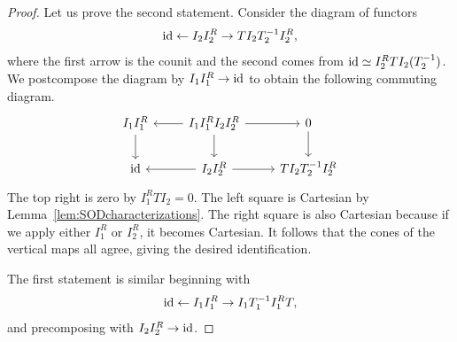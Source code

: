 \begin{proof}
    Let us prove the second statement. Consider the diagram of functors
    \[\operatorname{id}\leftarrow I_2I_2^R\to TI_2T_2^{-1}I_2^R,\]
    where the first arrow is the counit and the second comes from $\operatorname{id} \simeq I_2^RTI_2(T_2^{-1})$. We postcompose the diagram by $I_1I_1^R\to \operatorname{id}$ to obtain the following commuting diagram.
    \[\begin{tikzcd}[ampersand replacement=\&]
	{I_1I_1^R} \& {I_1I_1^RI_2I_2^R} \& 0 \\
        \id \& {I_2I_2^R} \& {TI_2T_2^{-1}I_2^R}
        \arrow[from=1-1, to=2-1]
        \arrow[from=1-2, to=1-1]
        \arrow[from=1-2, to=1-3]
        \arrow[from=1-2, to=2-2]
        \arrow[from=1-3, to=2-3]
        \arrow[from=2-2, to=2-1]
        \arrow[from=2-2, to=2-3]
    \end{tikzcd}\]
    The top right is zero by $I_1^RTI_2=0$. The left square is Cartesian by Lemma~\ref{lem:SODcharacterizations}. The right square is also Cartesian because if we apply either $I_1^R$ or $I_2^R$, it becomes Cartesian. It follows that the cones of the vertical maps all agree, giving the desired identification.

    The first statement is similar beginning with
    \[\operatorname{id}\leftarrow I_1I_1^R\to I_1T_1^{-1}I_1^RT,\]
    and precomposing with $I_2I_2^R\to \operatorname{id}$.
\end{proof}

